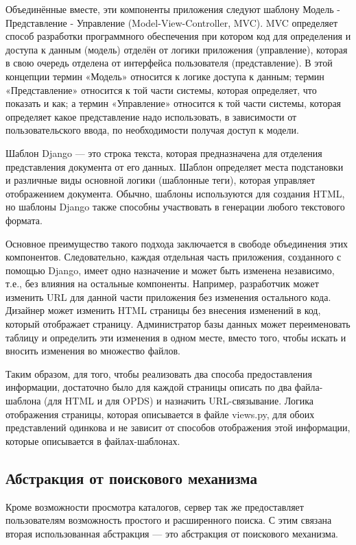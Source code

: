  Объединённые вместе, эти компоненты приложения следуют шаблону Модель - Представление - Управление  (Model-View-Controller, MVC). MVC определяет способ разработки программного обеспечения при котором код для определения и доступа к данным (модель) отделён от логики приложения (управление), которая в свою очередь отделена от интерфейса пользователя (представление). В этой концепции термин «Модель» относится к логике доступа к данным; термин «Представление» относится к той части системы, которая определяет, что показать и как; а термин «Управление» относится к той части системы, которая определяет какое представление надо использовать, в зависимости от пользовательского ввода, по необходимости получая доступ к модели. 

Шаблон Django — это строка текста, которая предназначена для отделения представления документа от его данных. Шаблон определяет места подстановки и различные виды основной логики (шаблонные теги), которая управляет отображением документа. Обычно, шаблоны используются для создания HTML, но шаблоны Django также способны участвовать в генерации любого текстового формата.

Основное преимущество такого подхода заключается в свободе объединения этих компонентов. Следовательно, каждая отдельная часть приложения, созданного с помощью Django, имеет одно назначение и может быть изменена независимо, т.е., без влияния на остальные компоненты. Например, разработчик может изменить URL для данной части приложения без изменения остального кода. Дизайнер может изменить HTML страницы без внесения изменений в код, который отображает страницу. Администратор базы данных может переименовать таблицу и определить эти изменения в одном месте, вместо того, чтобы искать и вносить изменения во множество файлов.

Таким образом, для того, чтобы реализовать два способа предоставления информации, достаточно было для каждой страницы описать по два файла-шаблона (для HTML и для OPDS) и назначить URL-связывание. Логика отображения страницы, которая описывается в файле views.py, для обоих представлений одинкова и не зависит от способов отображения этой информации, которые описывается в файлах-шаблонах.

\subsection{Абстракция от поискового механизма}

Кроме возможности просмотра каталогов, сервер так же предоставляет пользователям возможность простого и расширенного поиска. С этим связана вторая использованная абстракция --- это абстракция от поискового механизма. 

